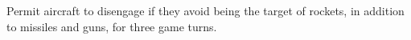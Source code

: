 \documentclass{report}
\newcommand{\changetag}[1]{\textbf{Change: #1.}\par}
\begin{document}
\begin{itemize}
        Permit aircraft to disengage if they avoid being the target of rockets, in addition to missiles and guns, for three game turns.
















\end{itemize}
\end{document}
